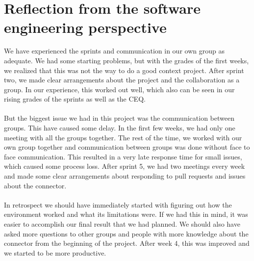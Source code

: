 \section{Reflection from the software engineering perspective}
We have experienced the sprints and communication in our own group as adequate. We had some starting problems, but with the grades of the first weeks, we realized that this was not the way to do a good context project. After sprint two, we made clear arrangements about the project and the collaboration as a group. In our experience, this worked out well, which also can be seen in our rising grades of the sprints as well as the CEQ.
\\\\
But the biggest issue we had in this project was the communication between groups. This have caused some delay. In the first few weeks, we had only one meeting with all the groups together. The rest of the time, we worked with our own group together and communication between groups was done without face to face communication. This resulted in a very late response time for small issues, which caused some process loss. After sprint 5, we had two meetings every week and made some clear arrangements about responding to pull requests and issues about the connector.
\\\\
In retrospect we should have immediately started with figuring out how the environment worked and what its limitations were. If we had this in mind, it was easier to accomplish our final result that we had planned. We should also have asked more questions to other groups and people with more knowledge about the connector from the beginning of the project. After week 4, this was improved and we started to be more productive. 



